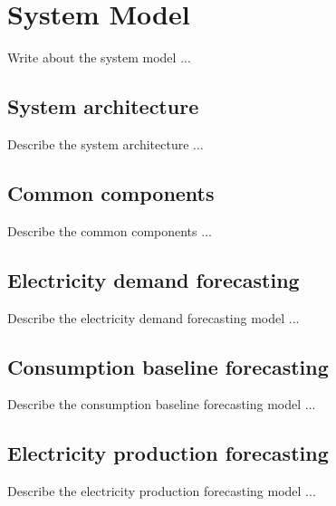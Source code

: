 \chapter{System Model}
\label{cha:system}
\vspace{0.4 cm}

Write about the system model ...


\section{System architecture}
\label{sec:architecture}
\vspace{0.2 cm}

Describe the system architecture ...


\section{Common components}
\label{sec:components}
\vspace{0.2 cm}

Describe the common components ...


\section{Electricity demand forecasting}
\label{sec:demandmodel}
\vspace{0.2 cm}

Describe the electricity demand forecasting model ...


\section{Consumption baseline forecasting}
\label{sec:baselinemodel}
\vspace{0.2 cm}

Describe the consumption baseline forecasting model ...


\section{Electricity production forecasting}
\label{sec:productionmodel}
\vspace{0.2 cm}

Describe the electricity production forecasting model ...
